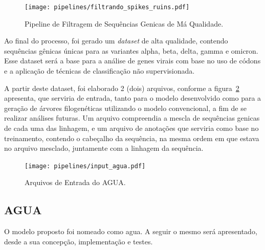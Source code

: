 \begin{enumerate}
        \begin{figure}[htb]
          \centering
          \caption{Pipeline de Filtragem de Sequências Genicas de Má Qualidade.}
          \texttt{[image: pipelines/filtrando\_spikes\_ruins.pdf]}
          ~\label{fig:spikesRuins}
        \end{figure}
\end{enumerate}

Ao final do processo, foi gerado um \textit{dataset} de alta qualidade, contendo sequências gênicas únicas para as variantes alpha, beta, delta, gamma e omicron. Esse dataset será a base para a análise de genes virais com base no uso de códons e a aplicação de técnicas de classificação não supervisionada.

A partir deste dataset, foi elaborado 2 (dois) arquivos, conforme a figura~\ref{fig:inputAgua} apresenta, que serviria de entrada, tanto para o modelo desenvolvido como para a geração de árvores filogenéticas utilizando o modelo convencional, a fim de se realizar análises futuras. Um arquivo compreendia a mescla de sequências genicas de cada uma das linhagem, e um arquivo de anotações que serviria como base no treinamento, contendo o cabeçalho da sequência, na mesma ordem em que estava no arquivo mesclado, juntamente com a linhagem da sequência.

\begin{figure}[htb]
  \centering
  \caption{Arquivos de Entrada do AGUA.}
  \texttt{[image: pipelines/input\_agua.pdf]}
  ~\label{fig:inputAgua}
\end{figure}

\subsection{AGUA}
O modelo proposto foi nomeado como \gls{agua}. A seguir o mesmo será apresentado, desde a sua concepção, implementação e testes.

